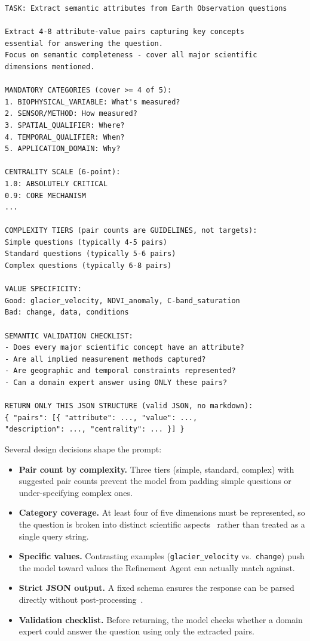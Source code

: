 \begin{lstlisting}[language={}, caption={Key sections of the ontology extraction prompt.}, label={lst:ontology-prompt-excerpt}]
TASK: Extract semantic attributes from Earth Observation questions

Extract 4-8 attribute-value pairs capturing key concepts
essential for answering the question.
Focus on semantic completeness - cover all major scientific
dimensions mentioned.

MANDATORY CATEGORIES (cover >= 4 of 5):
1. BIOPHYSICAL_VARIABLE: What's measured?
2. SENSOR/METHOD: How measured?
3. SPATIAL_QUALIFIER: Where?
4. TEMPORAL_QUALIFIER: When?
5. APPLICATION_DOMAIN: Why?

CENTRALITY SCALE (6-point):
1.0: ABSOLUTELY CRITICAL
0.9: CORE MECHANISM
...

COMPLEXITY TIERS (pair counts are GUIDELINES, not targets):
Simple questions (typically 4-5 pairs)
Standard questions (typically 5-6 pairs)
Complex questions (typically 6-8 pairs)

VALUE SPECIFICITY:
Good: glacier_velocity, NDVI_anomaly, C-band_saturation
Bad: change, data, conditions

SEMANTIC VALIDATION CHECKLIST:
- Does every major scientific concept have an attribute?
- Are all implied measurement methods captured?
- Are geographic and temporal constraints represented?
- Can a domain expert answer using ONLY these pairs?

RETURN ONLY THIS JSON STRUCTURE (valid JSON, no markdown):
{ "pairs": [{ "attribute": ..., "value": ...,
"description": ..., "centrality": ... }] }
\end{lstlisting}

Several design decisions shape the prompt:

\begin{itemize}
\item \textbf{Pair count by complexity.} Three tiers (simple, standard, complex) with suggested pair counts prevent the model from padding simple questions or under-specifying complex ones.
\item \textbf{Category coverage.} At least four of five dimensions must be represented, so the question is broken into distinct scientific aspects~\citep{berant2013semantic} rather than treated as a single query string.
\item \textbf{Specific values.} Contrasting examples (\texttt{glacier\_velocity} vs.\ \texttt{change}) push the model toward values the Refinement Agent can actually match against.
\item \textbf{Strict JSON output.} A fixed schema ensures the response can be parsed directly without post-processing~\citep{bechard2024reducing}.
\item \textbf{Validation checklist.} Before returning, the model checks whether a domain expert could answer the question using only the extracted pairs.
\end{itemize}

